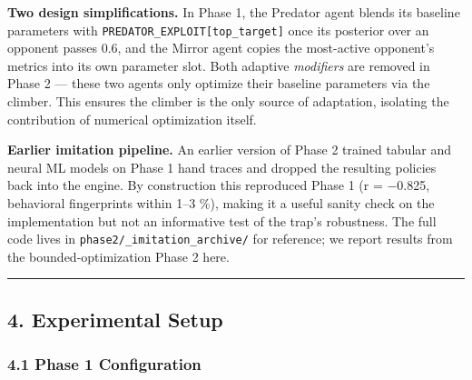 \documentclass[
]{article}
\begin{document}
\textbf{Two design simplifications.} In Phase 1, the Predator agent
blends its baseline parameters with
\texttt{PREDATOR\_EXPLOIT{[}top\_target{]}} once its posterior over an
opponent passes 0.6, and the Mirror agent copies the most-active
opponent's metrics into its own parameter slot. Both adaptive
\emph{modifiers} are removed in Phase 2 --- these two agents only
optimize their baseline parameters via the climber. This ensures the
climber is the only source of adaptation, isolating the contribution of
numerical optimization itself.

\textbf{Earlier imitation pipeline.} An earlier version of Phase 2
trained tabular and neural ML models on Phase 1 hand traces and dropped
the resulting policies back into the engine. By construction this
reproduced Phase 1 (r = −0.825, behavioral fingerprints within 1--3 \%),
making it a useful sanity check on the implementation but not an
informative test of the trap's robustness. The full code lives in
\texttt{phase2/\_imitation\_archive/} for reference; we report results
from the bounded-optimization Phase 2 here.

\begin{center}\rule{0.5\linewidth}{0.5pt}\end{center}

\hypertarget{experimental-setup}{%
\subsection{4. Experimental Setup}\label{experimental-setup}}

\hypertarget{phase-1-configuration}{%
\subsubsection{4.1 Phase 1 Configuration}\label{phase-1-configuration}}
\end{document}
